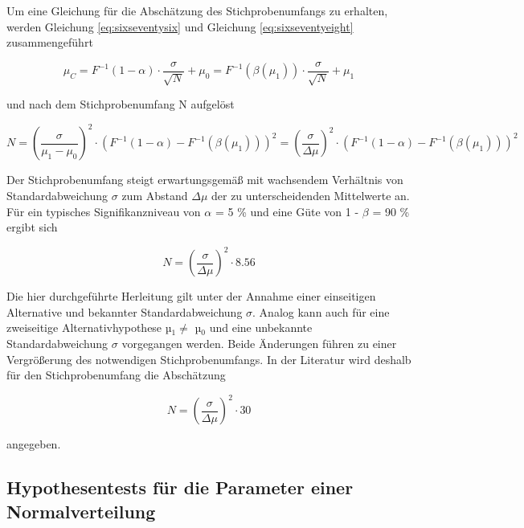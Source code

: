 \noindent Um eine Gleichung f\"{u}r die Absch\"{a}tzung des Stichprobenumfangs zu erhalten, werden Gleichung \eqref{eq:sixseventysix} und Gleichung \eqref{eq:sixseventyeight} zusammengef\"{u}hrt

\begin{equation}\label{eq:sixseventynine}
\mu _{C} =F^{-1} \left(1-\alpha \right)\cdot \dfrac{\sigma }{\sqrt{N} } +\mu _{0} =F^{-1} \left(\beta \left(\mu _{1} \right)\right)\cdot \dfrac{\sigma }{\sqrt{N} } +\mu _{1}
\end{equation}

\noindent und nach dem Stichprobenumfang N aufgel\"{o}st

\begin{equation}\label{eq:sixeighty}
N=\left(\dfrac{\sigma }{\mu _{1} -\mu _{0} } \right)^{2} \cdot \left(F^{-1} (1-\alpha)-F^{-1} \left(\beta \left(\mu _{1} \right)\right)\right)^{2} =\left(\dfrac{\sigma }{\Delta \mu } \right)^{2} \cdot \left(F^{-1} \left(1-\alpha \right)-F^{-1} \left(\beta (\mu _{1} )\right)\right)^{2}
\end{equation}

\noindent Der Stichprobenumfang steigt erwartungsgem\"{a}{\ss} mit wachsendem Verh\"{a}ltnis von Standardabweichung $\sigma$ zum Abstand $\Delta\mu$ der zu unterscheidenden Mittelwerte an. F\"{u}r ein typisches Signifikanzniveau von $\alpha$ = 5 \% und eine G\"{u}te von 1 - $\beta$ = 90 \% ergibt sich

\begin{equation}\label{eq:sixeightyone}
N=\left(\dfrac{\sigma }{\Delta \mu } \right)^{2} \cdot 8.56
\end{equation}

\noindent Die hier durchgef\"{u}hrte Herleitung gilt unter der Annahme einer einseitigen Alternative und bekannter Standardabweichung $\sigma$. Analog kann auch f\"{u}r eine zweiseitige Alternativhypothese µ$_{1} \neq$ µ$_{0}$ und eine unbekannte Standardabweichung $\sigma$ vorgegangen werden. Beide \"{A}nderungen f\"{u}hren zu einer Vergr\"{o}{\ss}erung des notwendigen Stichprobenumfangs. In der Literatur wird deshalb f\"{u}r den Stichprobenumfang die Absch\"{a}tzung

\begin{equation}\label{eq:sixeightytwo}
N=\left(\dfrac{\sigma }{\Delta \mu } \right)^{2} \cdot 30
\end{equation}

\noindent angegeben. 

\clearpage

\subsection{Hypothesentests f\"{u}r die Parameter einer Normalverteilung}


